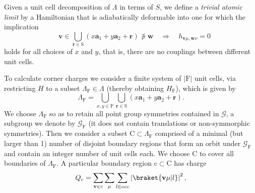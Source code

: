 Given a unit cell decomposition of $\Lambda$ in terms of $S$, we define a \emph{trivial atomic limit} by a Hamiltonian that is adiabatically deformable into one for which the implication
\begin{equation}
\quad \mathbf{v} \in \bigcup_{\mathbf{r} \in \mathrm{S}} \left(x \mathbf{a}_1 + y \mathbf{a}_2 + \mathbf{r} \right) \not\ni \mathbf{w} \quad \Rightarrow \quad h_{\mathbf{v} \mu, \mathbf{w} \nu} = 0
\end{equation}
holds for all choices of $x$ and $y$, that is, there are no couplings between different unit cells.

To calculate corner charges we consider a finite system of $|\mathrm{F}|$ unit cells, via restricting $H$ to a subset $\Lambda_\mathrm{F} \in \Lambda$ (thereby obtaining $H_\mathrm{F}$), which is given by
\begin{equation}
\label{eq:finitelattice}
\Lambda_\mathrm{F} = \bigcup_{x,y \in \mathrm{F}} \bigcup_{\mathbf{r} \in \mathrm{S}} \left(x \mathbf{a}_1 + y \mathbf{a}_2 + \mathbf{r} \right).
\end{equation}
We choose $\Lambda_\mathrm{F}$ so as to retain all point group symmetries contained in $\mathcal{G}$, a subgroup we denote by $\mathcal{G}_\mathrm{F}$ (it does not contain translations or non-symmorphic symmetries). Then we consider a subset $\mathrm{C} \subset \Lambda_\mathrm{F}$ comprised of a minimal (but larger than 1) number of disjoint boundary regions that form an orbit under $\mathcal{G}_\mathrm{F}$ and contain an integer number of unit cells each. We choose $\mathrm{C}$ to cover all boundaries of $\Lambda_\mathrm{F}$. A particular boundary region $\mathrm{c} \subset \mathrm{C}$ has charge
\begin{equation}
\label{eq:bdrychargedef}
Q_\mathrm{c} = \sum_{\mathbf{v} \in \mathrm{c}} \sum_\mu \sum_{l \in \mathrm{occ}} \left|\braket{\mathbf{v} \mu | l}\right|^2,
\end{equation}
